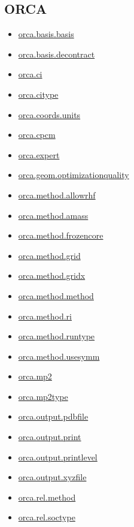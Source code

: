 \documentclass[11pt]{article}
\begin{document}
\subsection*{ORCA}
\begin{itemize}
\item \hyperref[kw:orca-basis-basis]{orca.basis.basis}
\item \hyperref[kw:orca-basis-decontract]{orca.basis.decontract}
\item \hyperref[kw:orca-ci]{orca.ci}
\item \hyperref[kw:orca-citype]{orca.citype}
\item \hyperref[kw:orca-coords-units]{orca.coords.units}
\item \hyperref[kw:orca-cpcm]{orca.cpcm}
\item \hyperref[kw:orca-expert]{orca.expert}
\item \hyperref[kw:orca-geom-optimizationquality]{orca.geom.optimizationquality}
\item \hyperref[kw:orca-method-allowrhf]{orca.method.allowrhf}
\item \hyperref[kw:orca-method-amass]{orca.method.amass}
\item \hyperref[kw:orca-method-frozencore]{orca.method.frozencore}
\item \hyperref[kw:orca-method-grid]{orca.method.grid}
\item \hyperref[kw:orca-method-gridx]{orca.method.gridx}
\item \hyperref[kw:orca-method-method]{orca.method.method}
\item \hyperref[kw:orca-method-ri]{orca.method.ri}
\item \hyperref[kw:orca-method-runtype]{orca.method.runtype}
\item \hyperref[kw:orca-method-usesymm]{orca.method.usesymm}
\item \hyperref[kw:orca-mp2]{orca.mp2}
\item \hyperref[kw:orca-mp2type]{orca.mp2type}
\item \hyperref[kw:orca-output-pdbfile]{orca.output.pdbfile}
\item \hyperref[kw:orca-output-print]{orca.output.print}
\item \hyperref[kw:orca-output-printlevel]{orca.output.printlevel}
\item \hyperref[kw:orca-output-xyzfile]{orca.output.xyzfile}
\item \hyperref[kw:orca-rel-method]{orca.rel.method}
\item \hyperref[kw:orca-rel-soctype]{orca.rel.soctype}

\end{itemize}
\end{document}

